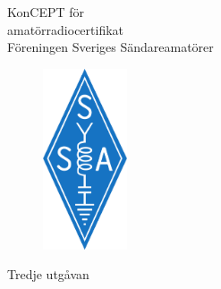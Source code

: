 \thispagestyle{empty}
\onecolumn
\vspace*{4cm}
\begin{center}
\sf
{\fontsize{1.75cm}{2.0cm}\mdseries Kon\selectfont{}CEPT \mdseries för \\[1ex]
amatörradiocertifikat} \\[1.15cm]
\huge{Föreningen Sveriges Sändareamatörer} \\
\end{center}
\begin{figure}[b]
\includegraphics[width=2.5cm]{images/ssa-logotyp.pdf}
\end{figure}
\vfill
\begin{flushright}
\huge{Tredje utgåvan}
\end{flushright}
\clearpage
\twocolumn
